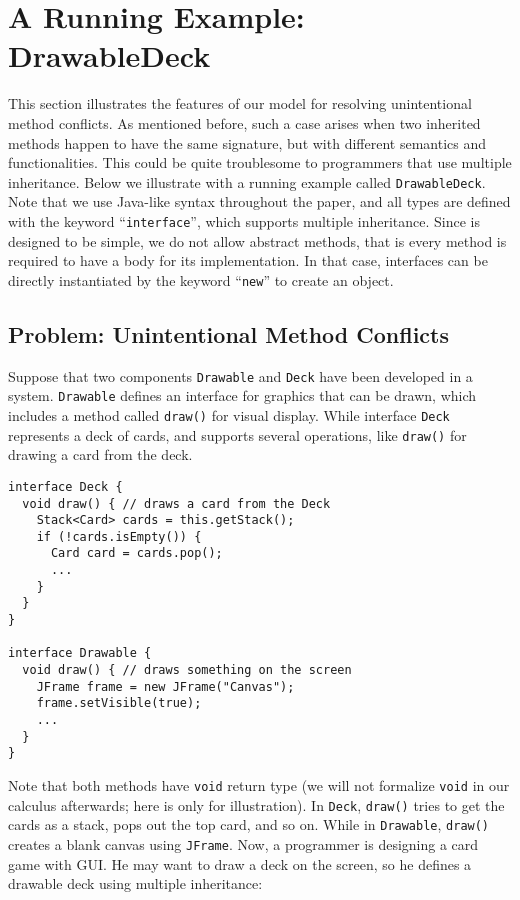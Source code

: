\section{A Running Example: DrawableDeck}

This section illustrates the features of our \MIM{} model for resolving unintentional method
conflicts. As mentioned before, such a case arises when two inherited methods happen to have the
same signature, but with different semantics and functionalities. This could be quite troublesome
to programmers that use multiple inheritance. Below we illustrate with a running example called \lstinline|DrawableDeck|.
Note that we use Java-like syntax throughout the paper, and all types are defined with the keyword ``\lstinline|interface|'', which
supports multiple inheritance. Since \MIM{} is designed to be simple, we do not allow abstract methods, that is every method
is required to have a body for its implementation. In that case, interfaces can be directly instantiated by the keyword ``\lstinline|new|''
to create an object.

\subsection{Problem: Unintentional Method Conflicts}

Suppose that two components \lstinline|Drawable| and \lstinline|Deck| have been developed in a system.
\lstinline|Drawable| defines an interface for graphics that can be drawn, which includes a method called \lstinline|draw()|
for visual display. While interface \lstinline|Deck| represents a deck of cards, and supports several operations, like
\lstinline|draw()| for drawing a card from the deck.

\vspace{3pt}\begin{lstlisting}
interface Deck {
  void draw() { // draws a card from the Deck
    Stack<Card> cards = this.getStack();
    if (!cards.isEmpty()) {
      Card card = cards.pop();
      ...
    }
  }
}

interface Drawable {
  void draw() { // draws something on the screen
    JFrame frame = new JFrame("Canvas");
    frame.setVisible(true);
    ...
  }
}
\end{lstlisting}\vspace{3pt}
Note that both methods have \lstinline|void| return type (we will not formalize
\lstinline|void| in our calculus afterwards; here is only for illustration). In \lstinline|Deck|, \lstinline|draw()| tries to get the cards as a stack, pops
out the top card, and so on. While in \lstinline|Drawable|, \lstinline|draw()|
creates a blank canvas using \lstinline|JFrame|. Now, a programmer is designing a
card game with GUI. He may want to draw a deck on the screen, so he defines a drawable
deck using multiple inheritance:

